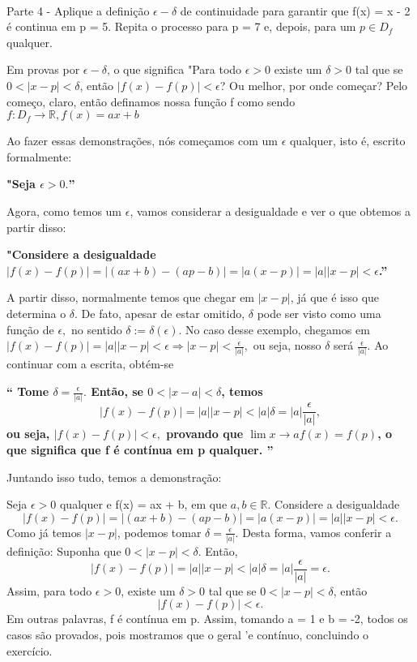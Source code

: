\documentclass[Calculus1/exercícios_de_cálculo.tex]{subfiles}
\begin{document}
\paragraph{} Parte 4 - Aplique a definição $\epsilon-\delta$ de continuidade para garantir que f(x) = x - 2 é continua em p = 5. Repita o processo para p = 7 e, depois, para um $p\in{D_f}$ qualquer.
\begin{proof*}
	Em provas por $\epsilon-\delta$, o que significa "Para todo $\epsilon > 0$ existe um $\delta > 0$ tal que se $0 < |x - p| < \delta$, então $|f(x) - f(p)| < \epsilon$? Ou melhor, por onde começar? Pelo começo, claro, então definamos nossa funç\~ao f como sendo $f:D_f\rightarrow\mathbb{R}, f(x) = ax + b$

	Ao fazer essas demonstrações, nós começamos com um $\epsilon$ qualquer, isto é, escrito formalmente:

	\textbf{"Seja $\epsilon > 0.$''}

	Agora, como temos um $\epsilon$, vamos considerar a desigualdade e ver o que obtemos a partir disso:

	\textbf{"Considere a desigualdade $|f(x) - f(p)| = |(ax + b) - (ap - b)| = |a(x - p)| = |a||x - p|< \epsilon$.'' }

	A partir disso, normalmente temos que chegar em $|x - p|$, já que é isso que determina o $\delta.$ De fato, apesar de estar omitido, $\delta$ pode ser visto como uma função de $\epsilon,$ no sentido $\delta := \delta(\epsilon).$
	No caso desse exemplo, chegamos em $|f(x) - f(p)| = |a||x - p| < \epsilon \Rightarrow |x - p| < \frac{\epsilon}{|a|},$ ou seja, nosso $\delta$ será $\frac{\epsilon}{|a|}$. Ao continuar com a escrita, obtém-se

	\textbf{``
		Tome $\delta = \frac{\epsilon}{|a|}.$ Então, se $0 < |x - a| < \delta$, temos
		$$
			|f(x) - f(p)| = |a||x - p| < |a|\delta = |a|\frac{\epsilon}{|a|},
		$$
		ou seja, $|f(x) - f(p)| < \epsilon,$ provando que $\lim{x\to{a}} f(x) = f(p)$, o que significa que f é contínua em p qualquer.
		''}

	Juntando isso tudo, temos a demonstração:

	Seja $\epsilon > 0$ qualquer e f(x) = ax + b, em que $a, b\in\mathbb{R}$. Considere a desigualdade
	$$
		|f(x) - f(p)| = |(ax + b) - (ap - b)| = |a(x - p)| = |a||x - p|< \epsilon.
	$$
	Como já temos $|x - p|$, podemos tomar $\delta = \frac{\epsilon}{|a|}.$ Desta forma, vamos conferir a definição: Suponha que $0 < |x - p| < \delta.$ Então,
	$$
		|f(x) - f(p)| = |a||x - p| < |a|\delta = |a|\frac{\epsilon}{|a|} = \epsilon.
	$$
	Assim, para todo $\epsilon > 0$, existe um $\delta > 0$ tal que se $0 < |x - p| < \delta$, então
	$$
		|f(x) - f(p)| < \epsilon.
	$$
	Em outras palavras, f é contínua em p. Assim, tomando a = 1 e b = -2, todos os casos são provados, pois mostramos que o geral 'e cont\'inuo, concluindo o exerc\'icio.
	\qedsymbol
\end{proof*}
\end{document}
